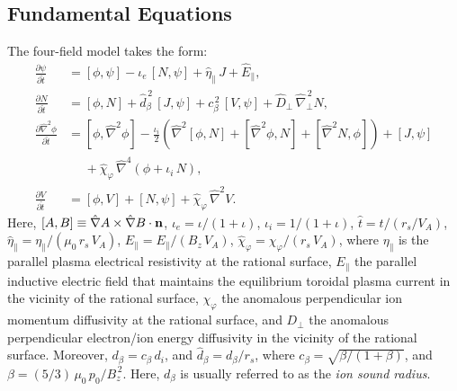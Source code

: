 \documentclass[12pt,prb,aps]{revtex4-1}
\begin{document}
\subsection{Fundamental Equations}
The four-field model takes the form:\,\cite{fw,cole,rf2022}
\begin{align}\label{e12v}
\frac{\partial\psi}{\partial\hat{t}}&= [\phi,\psi] -\iota_e\,[N,\psi]
+\hat{\eta}_\parallel\,J + \hat{E}_\parallel,\\[0.5ex]
\frac{\partial N}{\partial \hat{t}}&= [\phi,N] +\hat{d}_\beta^{\,2}\,[J,\psi]+c_\beta^{\,2}\,[V,\psi] 
+ \hat{D}_\perp\,\hat{\nabla}_\perp^{\,2}N,\\[0.5ex]
\frac{\partial \hat{\nabla}^2\phi}{\partial \hat{t}}&= [\phi,\hat{\nabla}^2\phi] - \frac{\iota_i}{2}\left(\hat{\nabla}^2[\phi,N] + [\hat{\nabla}^2\phi,N] + [\hat{\nabla}^2 N,\phi]\right) + [J,\psi] \nonumber\\[0.5ex]&\phantom{=}+\hat{\chi}_\varphi  \,\hat{\nabla}^4\!\left(\phi + \iota_i\,N\right), \\[0.5ex]
\frac{\partial V}{\partial\hat{t}}&= [\phi,V] +[N,\psi] + \hat{\chi}_\varphi\,\hat{\nabla}^2 V.\label{e21}
\end{align}
Here, $[A,B]\equiv \hat{\nabla} A\times \hat{\nabla} B\cdot {\bf n}$, $\iota_e=\iota/(1+\iota)$, $\iota_i=1/(1+\iota)$, $\hat{t} = t/(r_s/V_A)$, $\hat{\eta}_{\parallel} = \eta_{\parallel}/(\mu_0\,r_s\,V_A)$, $\hat{E}_\parallel = E_\parallel/(B_z\,V_A)$, 
$\hat{\chi}_\varphi= \chi_\varphi/(r_s\,V_A)$, where $\eta_{\parallel}$ is the parallel  plasma electrical
resistivity at the rational surface, $E_\parallel$ the parallel inductive electric field that maintains the equilibrium toroidal
plasma current in the vicinity of the rational surface, $\chi_\varphi$  the anomalous perpendicular ion momentum
diffusivity at the rational surface, and $D_\perp$ the  anomalous perpendicular electron/ion  energy diffusivity in the vicinity of the rational surface. 
Moreover, $d_\beta=c_\beta\,d_i$, and $\hat{d}_\beta=d_\beta/r_s$, where $c_\beta = \sqrt{\beta/(1+\beta)}$, and
$\beta=(5/3)\,\mu_0\,p_0/B_z^{\,2}$. Here, $d_\beta$ is usually referred to as the {\em ion sound radius}.  
\end{document}
